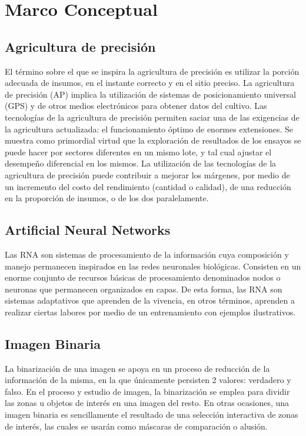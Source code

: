 \chapter{Marco Conceptual}

	\section{Agricultura de precisión} El término sobre el que se inspira la agricultura de precisión es utilizar la porción adecuada de insumos, en el instante correcto y en el sitio preciso. La agricultura de precisión (AP) implica la utilización de sistemas de posicionamiento universal (GPS) y de otros medios electrónicos para obtener datos del cultivo. Las tecnologías de la agricultura de precisión permiten saciar una de las exigencias de la agricultura actualizada: el funcionamiento óptimo de enormes extensiones. Se muestra como primordial virtud que la exploración de resultados de los ensayos se puede hacer por sectores diferentes en un mismo lote, y tal cual ajustar el desempeño diferencial en los mismos. La utilización de las tecnologías de la agricultura de precisión puede contribuir a mejorar los márgenes, por medio de un incremento del costo del rendimiento (cantidad o calidad), de una reducción en la proporción de insumos, o de los dos paralelamente.
	\\
	\section{Artificial Neural Networks} Las RNA son sistemas de procesamiento de la información cuya composición y manejo permanecen inspirados en las redes neuronales biológicas. Consisten en un enorme conjunto de recursos básicas de procesamiento denominados nodos o neuronas que permanecen organizados en capas. De esta forma, las RNA son sistemas adaptativos que aprenden de la vivencia, en otros términos, aprenden a realizar ciertas labores por medio de un entrenamiento con ejemplos ilustrativos.
	\\ 
	
	\section{Imagen Binaria} La binarización de una imagen se apoya en un proceso de reducción de la información de la misma, en la que únicamente persisten 2 valores: verdadero y falso. En el proceso y estudio de imagen, la binarización se emplea para dividir las zonas u objetos de interés en una imagen del resto. En otras ocasiones, una imagen binaria es sencillamente el resultado de una selección interactiva de zonas de interés, las cuales se usarán como máscaras de comparación o alusión.
	\\ 
	
